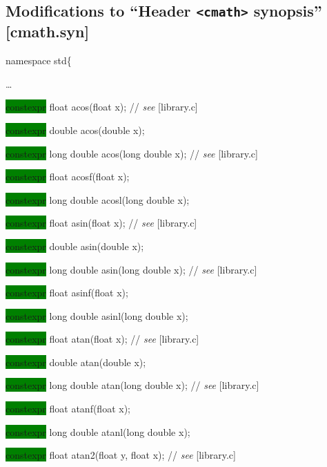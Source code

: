 \documentclass[prd,twocolumn,amsmath,amssymb,nofootinbib,eqsecnum]{revtex4-1}
\newcommand{\code}[1]{{\tt #1}}
\newcommand{\header}[1]{{\tt <#1>}}
\newcommand{\highlight}[1]{\colorbox{green}{\!\!\!\! #1}}
\newcommand{\stdcomment}[1]{{// {\it see} [#1]}}
\begin{document}
\subsection{Modifications to  ``Header \header{cmath} synopsis'' [cmath.syn]}


\code{

namespace std\{

\vspace{2ex}
\ldots
\vspace{2ex}


\highlight{constexpr} float acos(float x); \stdcomment{library.c}

\highlight{constexpr} double acos(double x);

\highlight{constexpr} long double acos(long double x); \stdcomment{library.c}

\highlight{constexpr} float acosf(float x);

\highlight{constexpr} long double acosl(long double x);

\vspace{2ex}


\highlight{constexpr} float asin(float x); \stdcomment{library.c}

\highlight{constexpr} double asin(double x);

\highlight{constexpr} long double asin(long double x); \stdcomment{library.c}

\highlight{constexpr} float asinf(float x);

\highlight{constexpr} long double asinl(long double x);

\vspace{2ex}


\highlight{constexpr} float atan(float x); \stdcomment{library.c}

\highlight{constexpr} double atan(double x);

\highlight{constexpr} long double atan(long double x); \stdcomment{library.c}

\highlight{constexpr} float atanf(float x);

\highlight{constexpr} long double atanl(long double x);

\vspace{2ex}


\highlight{constexpr} float atan2(float y, float x); \stdcomment{library.c}

}
\end{document}
